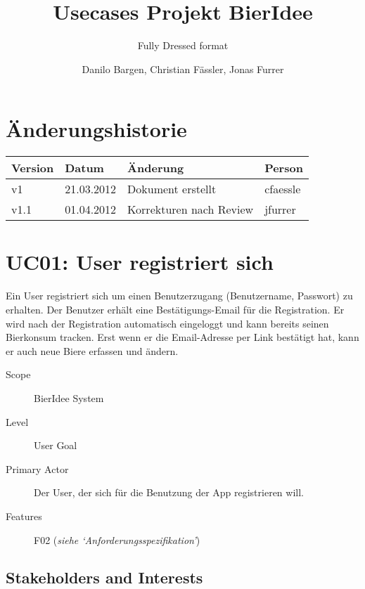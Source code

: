 \documentclass[10pt,a4paper]{scrartcl}
\author{Danilo Bargen, Christian Fässler, Jonas Furrer}
\title{Usecases Projekt BierIdee}
\subtitle{Fully Dressed format}
\begin{document}
\begin{titlepage}
	\maketitle
	\vspace{120mm}
	\thispagestyle{empty} %
\end{titlepage}

\section{Änderungshistorie}
\begin{tabular}{p{}p{}p{}p{}}
\toprule
\textbf{Version} & \textbf{Datum} & \textbf{Änderung} & \textbf{Person} \\  
\midrule
v1 & 21.03.2012 & Dokument erstellt & cfaessle \\  
\hline 
v1.1 & 01.04.2012 & Korrekturen nach Review & jfurrer \\
\bottomrule
\end{tabular} 
\newpage

\section*{UC01: User registriert sich }

Ein User registriert sich um einen Benutzerzugang (Benutzername, Passwort) zu erhalten. Der Benutzer erhält eine Bestätigungs-Email für die Registration. Er wird nach der Registration automatisch eingeloggt und kann bereits seinen Bierkonsum tracken. Erst wenn er die Email-Adresse per Link bestätigt hat, kann er auch neue Biere erfassen und ändern.


\begin{description}
\item[Scope] BierIdee System
\item[Level] User Goal
\item[Primary Actor] Der User, der sich für die Benutzung der App registrieren will.
\item[Features] F02 (\textit{siehe `Anforderungsspezifikation'})
\end{description}


\subsection*{Stakeholders and Interests}
\end{document}

